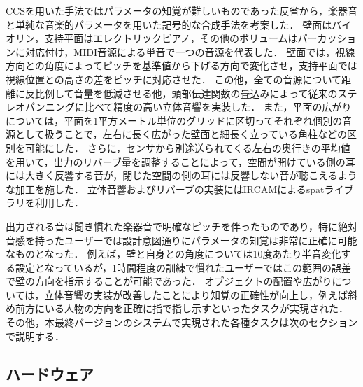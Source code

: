 CCSを用いた手法ではパラメータの知覚が難しいものであった反省から，楽器音と単純な音楽的パラメータを用いた記号的な合成手法を考案した．
壁面はバイオリン，支持平面はエレクトリックピアノ，その他のボリュームはパーカッションに対応付け，MIDI音源による単音で一つの音源を代表した．
壁面では，視線方向との角度によってピッチを基準値から下げる方向で変化させ，支持平面では視線位置との高さの差をピッチに対応させた．
この他，全ての音源について距離に反比例して音量を低減させる他，頭部伝達関数の畳込みによって従来のステレオパンニングに比べて精度の高い立体音響を実装した．
また，平面の広がりについては，平面を1平方メートル単位のグリッドに区切ってそれぞれ個別の音源として扱うことで，左右に長く広がった壁面と細長く立っている角柱などの区別を可能にした．
さらに，センサから別途送られてくる左右の奥行きの平均値を用いて，出力のリバーブ量を調整することによって，空間が開けている側の耳には大きく反響する音が，閉じた空間の側の耳には反響しない音が聴こえるような加工を施した．
立体音響およびリバーブの実装にはIRCAMによるspatライブラリを利用した．

出力される音は聞き慣れた楽器音で明確なピッチを伴ったものであり，特に絶対音感を持ったユーザーでは設計意図通りにパラメータの知覚は非常に正確に可能なものとなった．
例えば，壁と自身との角度については10度あたり半音変化する設定となっているが，1時間程度の訓練で慣れたユーザーではこの範囲の誤差で壁の方向を指示することが可能であった．
オブジェクトの配置や広がりについては，立体音響の実装が改善したことにより知覚の正確性が向上し，例えば斜め前方にいる人物の方向を正確に指で指し示すといったタスクが実現された．
その他，本最終バージョンのシステムで実現された各種タスクは次のセクションで説明する．

\subsection{ハードウェア}


